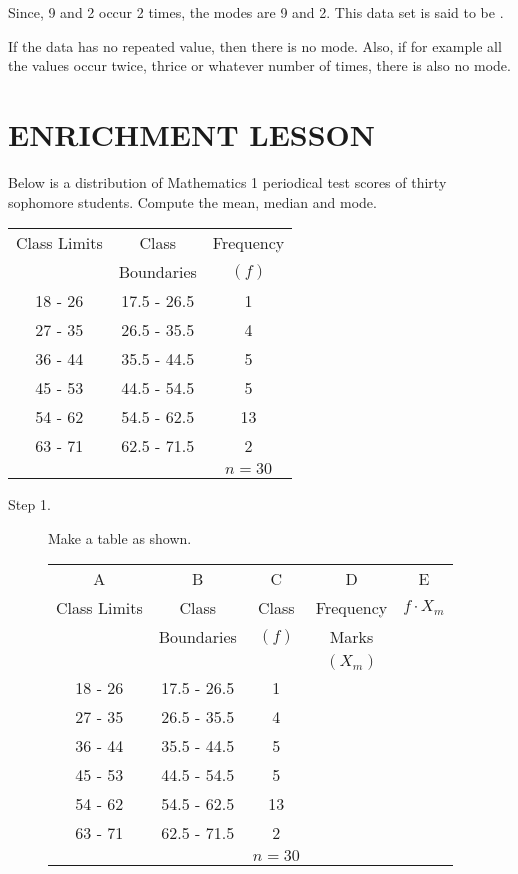 \begin{example}
\begin{myenumerate}
\begin{description}
Since, 9 and 2 occur 2 times, the modes are 9 and 2. This data set is said
to be .

If the data has no repeated value, then there is no mode. Also, if for example all
the values occur twice, thrice or whatever number of times, there is also no
mode.
\end{description}
\end{myenumerate}
\end{example}

\section*{ENRICHMENT LESSON}
\begin{example}
\Item Below is a distribution of Mathematics 1 periodical test scores of thirty
sophomore students. Compute the mean, median and mode.
\begin{center}
\begin{tabular}{ccc}
\hline \hline 
Class Limits & Class & Frequency\\
 & Boundaries & $(f)$\\
\hline
18 - 26 & 17.5 - 26.5 & 1\\
27 - 35 & 26.5 - 35.5 & 4\\
36 - 44 & 35.5 - 44.5 & 5\\
45 - 53 & 44.5 - 54.5 & 5\\
54 - 62 & 54.5 - 62.5 & 13\\
63 - 71 & 62.5 - 71.5 & 2\\
\hline
 & & $n=30$\\
\end{tabular}
\end{center}
\Solution

\begin{myenumerate}
\item {}
\begin{description}
\item[Step 1.] Make a table as shown.
\begin{center}
\begin{tabular}{ccccc}
\hline \hline
A & B & C & D & E\\
Class Limits & Class & Class & Frequency & $f\cdot X_m$\\
 & Boundaries & $(f)$ & Marks & \\
 &  &  & $(X_m)$ & \\
\hline
18 - 26 & 17.5 - 26.5 & 1  & & \\
27 - 35 & 26.5 - 35.5 & 4  & & \\ 
36 - 44 & 35.5 - 44.5 & 5  &  & \\
45 - 53 & 44.5 - 54.5 & 5  &  & \\
54 - 62 & 54.5 - 62.5 & 13 &  & \\
63 - 71 & 62.5 - 71.5 & 2  &  & \\
\hline
 & & $n=30$ & & \\
\end{tabular}
\end{center}


\end{description}
\end{myenumerate}
\end{example}
